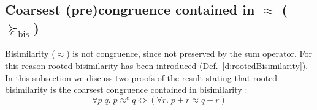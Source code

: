 
\subsection{Coarsest (pre)congruence contained in $\approx$ ($\succeq_{\mathrm{bis}}$)}
\label{s:coarsest}


Bisimilarity ($\approx$) is not congruence, since not preserved by 
the sum operator. For this reason rooted bisimilarity has been
introduced (Def.~\ref{d:rootedBisimilarity}). 
In this subsection we discuss  two proofs of the result stating that
rooted bisimilarity is the coarsest congruence contained in
bisimilarity \cite{vanGlabbeek:2005ur,Gorrieri:2015jt,Mil89}:
\begin{equation}
\label{eq:coarsest}
\forall p\; q.\; p \approx^c\! q \Leftrightarrow ( \forall r.\; p+r \approx q+r )
\end{equation}


